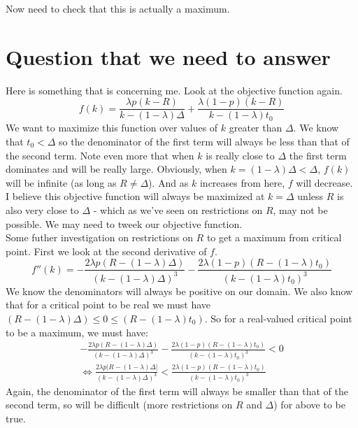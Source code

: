 Now need to check that this is actually a maximum.

\section{Question that we need to answer}

Here is something that is concerning me. Look at the objective function again.
\begin{equation*}
f(k) = \frac{\lambda p (k-R)}{k-(1-\lambda)\Delta} + \frac{\lambda (1-p) (k-R)}{k-(1-\lambda)t_0}
\end{equation*}
We want to maximize this function over values of $k$ greater than $\Delta$. We know that $t_0 < \Delta$ so the denominator of the first term will always be less than that of the second term. Note even more that when $k$ is really close to $\Delta$ the first term dominates and will be really large. Obviously, when $k = (1-\lambda)\Delta < \Delta$, $f(k)$ will be infinite (as long as $R \neq \Delta$). And as $k$ increases from here, $f$ will decrease. I believe this objective function will always be maximized at $k=\Delta$ unless $R$ is also very close to $\Delta$ - which as we've seen on restrictions on $R$, may not be possible. We may need to tweek our objective function. \\

Some futher investigation on restrictions on $R$ to get a maximum from critical point. First we look at the second derivative of $f$.
\begin{equation*}
f''(k) = -\frac{2\lambda p (R-(1-\lambda)\Delta)}{(k-(1-\lambda)\Delta)^3}-\frac{2\lambda(1-p)(R-(1-\lambda)t_0)}{(k-(1-\lambda)t_0)^3}
\end{equation*}
We know the denominators will always be positive on our domain. We also know that for a critical point to be real we must have $(R-(1-\lambda)\Delta) \leq 0 \leq (R-(1-\lambda)t_0)$. So for a real-valued critical point to be a maximum, we must have:
\begin{gather*}
-\frac{2\lambda p (R-(1-\lambda)\Delta)}{(k-(1-\lambda)\Delta)^3}-\frac{2\lambda(1-p)(R-(1-\lambda)t_0)}{(k-(1-\lambda)t_0)^3} < 0 \\
\iff \frac{2\lambda p |R-(1-\lambda)\Delta|}{(k-(1-\lambda)\Delta)^3} < \frac{2\lambda (1-p)(R-(1-\lambda)t_0)}{(k-(1-\lambda)t_0)^3}
\end{gather*}
Again, the denominator of the first term will always be smaller than that of the second term, so will be difficult (more restrictions on $R$ and $\Delta$) for above to be true. \\

